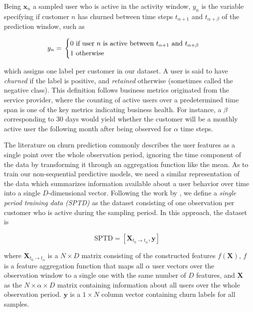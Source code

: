 \documentclass{kththesis}
\begin{document}
Being $\mathbf{x}_n$ a sampled user who is active in the activity window, $y_{n}$ is the variable specifying if customer $n$ has churned between time steps $t_{\alpha+1}$ and $t_{\alpha+\beta}$ of the prediction window, such as

\begin{equation}
y_n = \\ 
\begin{cases}
  \text{0 if user $n$ is active between $t_{\alpha+1}$ and $t_{\alpha+\beta}$} \\    
  \text{1 otherwise}    
\end{cases}
\end{equation}

which assigns one label per customer in our dataset. A user is said to have \emph{churned} if the label is positive, and \emph{retained} otherwise (sometimes called the negative class). This definition follows business metrics originated from the service provider, where the counting of active users over a predetermined time span is one of the key metrics indicating business health. For instance, a $\beta$ corresponding to 30 days would yield whether the customer will be a monthly active user the following month after being observed for $\alpha$ time steps. 

The literature on churn prediction commonly describes the user features as a single point over the whole observation period, ignoring the time component of the data by transforming it through an aggregation function like the mean. As to train our non-sequential predictive models, we need a similar representation of the data which summarizes information available about a user behavior over time into a single $D$-dimensional vector. Following the work by \citep{GurAli2014}, we define a \emph{single period training data (SPTD)} as the dataset consisting of one observation per customer who is active during the sampling period. In this approach, the dataset is 

\begin{equation}
\text{SPTD} = [\mathbf{X}_{t_0 \rightarrow t_\alpha}, \mathbf{y}]
\end{equation}

where $\mathbf{X}_{t_0\rightarrow t_\alpha}$ is a $N \times D$ matrix consisting of the constructed features $f(\mathbf{X})$, $f$ is a feature aggregation function that maps all $\alpha$ user vectors over the observation window to a single one with the same number of $D$ features, and  $\mathbf{X}$ as the $N \times \alpha \times D$ matrix containing information about all users over the whole observation period. $\mathbf{y}$ is a $1 \times N$ column vector containing churn labels for all samples. 
\end{document}
